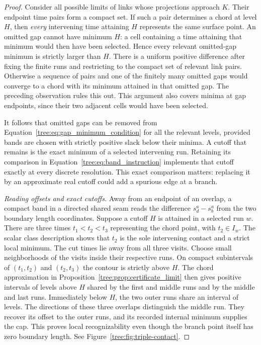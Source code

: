 \begin{proof}
Consider all possible limits of links whose projections approach $K$.
Their endpoint time pairs form a compact set.  If such a pair determines
a chord at level $H$, then \emph{every} intervening time attaining $H$
represents the same surface point.  An omitted gap cannot have minimum
$H$: a cell containing a time attaining that minimum would then have
been selected.  Hence every relevant omitted-gap minimum is strictly
larger than $H$.  There is a uniform positive difference after fixing
the finite runs and restricting to the compact set of relevant link
pairs.  Otherwise a sequence of pairs and one of the finitely many
omitted gaps would converge to a chord with its minimum attained in
that omitted gap.  The preceding observation rules this out.  This
argument also covers minima at gap endpoints, since their two adjacent
cells would have been selected.

It follows that omitted gaps can be removed from
Equation~\eqref{tree:eq:gap_minimum_condition} for all the relevant levels,
provided bands are chosen with strictly positive slack below their
minima.  A cutoff that remains is the exact minimum of a selected
intervening run.  Retaining its comparison in
Equation~\eqref{tree:eq:band_instruction} implements that cutoff exactly
at every discrete resolution.  This exact comparison matters: replacing
it by an approximate real cutoff could add a spurious edge at a branch.

\emph{Reading offsets and exact cutoffs.}
Away from an endpoint of an overlap, a compact band in a
directed shared seam reads the difference $s_d^a-s_b^a$ from the two
boundary length coordinates.  Suppose a cutoff $H$ is attained in a
selected run $w$.  There are three times $t_1<t_2<t_3$ representing the
chord point, with $t_2\in I_w$.  The scalar class description shows
that $t_2$ is the sole intervening contact and a strict local minimum.
The cut times lie away from all three visits.  Choose small neighborhoods
of the visits inside their respective runs.  On compact subintervals
of $(t_1,t_2)$ and $(t_2,t_3)$ the contour is strictly above $H$.
The chord approximation in Proposition~\ref{tree:prop:certificate_limit}
then gives positive intervals of levels above $H$ shared by the first
and middle runs and by the middle and last runs.  Immediately below
$H$, the two outer runs share an interval of levels.  The directions
of these three overlaps distinguish the middle run.  They recover its
offset to the outer runs, and its recorded internal minimum supplies
the cap.  This proves local recognizability even though the branch
point itself has zero boundary length.
See Figure~\ref{tree:fig:triple-contact}.


\end{proof}

